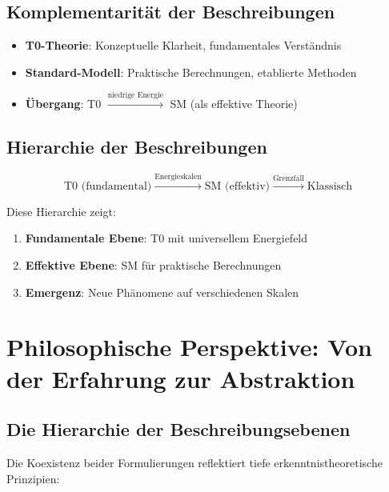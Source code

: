 \documentclass[12pt,a4paper]{article}
\begin{document}
	\subsection{Komplementarität der Beschreibungen}
	
	\begin{tcolorbox}[colback=yellow!5!white,colframe=yellow!75!black,title=Fundamentale Komplementarität]
		\begin{itemize}
			\item \textbf{T0-Theorie}: Konzeptuelle Klarheit, fundamentales Verständnis
			\item \textbf{Standard-Modell}: Praktische Berechnungen, etablierte Methoden
			\item \textbf{Übergang}: T0 $\xrightarrow{\text{niedrige Energie}}$ SM (als effektive Theorie)
		\end{itemize}
	\end{tcolorbox}
	
	\subsection{Hierarchie der Beschreibungen}
	
	\begin{equation}
		\text{T0 (fundamental)} \xrightarrow{\text{Energieskalen}} \text{SM (effektiv)} \xrightarrow{\text{Grenzfall}} \text{Klassisch}
	\end{equation}
	
	Diese Hierarchie zeigt:
	\begin{enumerate}
		\item \textbf{Fundamentale Ebene}: T0 mit universellem Energiefeld
		\item \textbf{Effektive Ebene}: SM für praktische Berechnungen
		\item \textbf{Emergenz}: Neue Phänomene auf verschiedenen Skalen
	\end{enumerate}
	
	\section{Philosophische Perspektive: Von der Erfahrung zur Abstraktion}
	
	\subsection{Die Hierarchie der Beschreibungsebenen}
	
	Die Koexistenz beider Formulierungen reflektiert tiefe erkenntnistheoretische Prinzipien:
	
\end{document}
